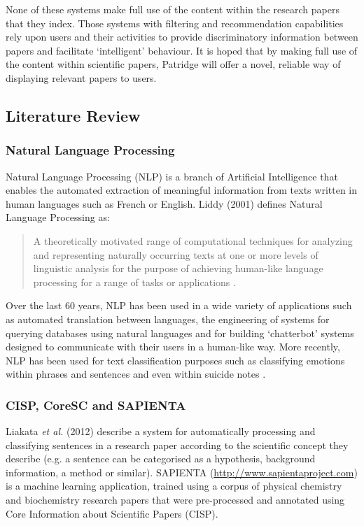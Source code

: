 None of these systems make full use of the content within the research papers
that they index. Those systems with filtering and recommendation capabilities
rely upon users and their activities to provide discriminatory information
between papers and facilitate `intelligent' behaviour. It is hoped that by
making full use of the content within scientific papers, Patridge will offer a
novel, reliable way of displaying relevant papers to users.

\subsection{ Literature Review}

\subsubsection{Natural Language Processing}

Natural Language Processing (NLP)  is a branch of Artificial Intelligence that
enables the automated extraction of meaningful information from texts written
in human languages such as French or English. Liddy (2001) defines Natural
Language Processing as:

\begin{quotation} 
A theoretically motivated range of computational techniques for analyzing and
representing naturally occurring texts at one or more levels of linguistic
analysis for the purpose of achieving human-like language processing for a
range of tasks or applications \cite{liddy2001natural}.  
\end{quotation}

Over the last 60 years, NLP has been used in a wide variety of applications
such as automated translation between languages\cite{hutchins2004first}, the
engineering of systems for querying databases using natural languages
\cite{rao2010natural} and for building `chatterbot' systems designed to
communicate with their users in a human-like way\cite{Alfonsi2006}.
More recently, NLP has been used for text classification purposes such as
classifying emotions within phrases and sentences \cite{Wilson05Polarity} and
even within suicide notes \cite{citeulike:11077287}.


\subsubsection{CISP, CoreSC and SAPIENTA}

Liakata \emph{et al.} (2012) describe a system for automatically processing and
classifying sentences in a research paper according to the scientific concept
they describe (e.g. a sentence can be categorised as a hypothesis, background
information, a method or similar)\cite{citeulike:10444769}. SAPIENTA
(\url{http://www.sapientaproject.com}) is a machine learning application,
trained using a corpus of physical chemistry and biochemistry research papers
that were pre-processed and annotated using Core Information about Scientific
Papers (CISP)\cite{LIAKATA10.644}. 

